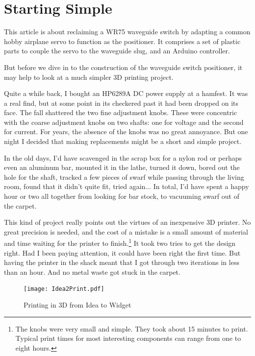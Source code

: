 \documentclass[12pt]{article}
\begin{document}
\section{Starting Simple}

This article is about reclaiming a WR75 waveguide switch by adapting
a common hobby airplane servo to function as the positioner. It comprises
a set of plastic parts to couple the servo to the waveguide slug,
and an Arduino controller.

But before we dive in to the construction of the waveguide switch positioner,
it may help to look at a much simpler 3D printing project.

Quite a while back, I bought an HP6289A DC power supply at a hamfest.
It was a real find, but at some point in its checkered past it had
been dropped on its face.  The fall shattered the two fine adjustment
knobs.  These were concentric with the coarse adjustment knobs on two
shafts: one for voltage and the second for current.  For years, the
absence of the knobs was no great annoyance. But one night I decided
that making replacements might be a short and simple project.

In the old days, I'd have scavenged in the scrap box for a nylon rod
or perhaps even an aluminum bar, mounted it in the lathe, turned it down,
bored out the hole for the shaft, tracked a few pieces of swarf while
passing through the living room, found that it didn't quite fit, tried
again... In total, I'd have spent a happy hour or two all together from
looking for bar stock, to vacuuming swarf out of the carpet.

This kind of project really points out the virtues of an inexpensive
3D printer.  No great precision is needed, and the cost of a mistake
is a small amount of material and time waiting for the
printer to finish.\footnote{The knobs were very small and simple. They
  took about 15 minutes to print. Typical
  print times for most interesting components can range from one to
  eight hours.}
It took two tries to get the design right. Had I
been paying attention, it could have been right the first time.
But having the printer in the shack
meant that I got through two iterations in less than an hour.
And no metal waste got stuck in the carpet. 

\begin{figure}[tb]
  \centering
  \texttt{[image: Idea2Print.pdf]}
  \caption{\label{f_3d_process}Printing in 3D from Idea to Widget}
\end{figure}
\end{document}
